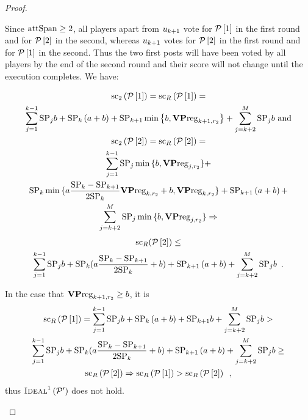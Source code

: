 \documentclass[a4paper,english,cleveref, autoref]{oasics-v2019}
\begin{document}
\begin{subappendices}
\begin{proof}
\begin{itemize}
    Since $\mathrm{attSpan} \geq 2$, all players apart from $u_{k + 1}$ vote for
    $\mathcal{P}\left[1\right]$ in the first round and for
    $\mathcal{P}\left[2\right]$ in the second, whereas $u_{k + 1}$ votes for
    $\mathcal{P}\left[2\right]$ in the first round and for
    $\mathcal{P}\left[1\right]$ in the second. Thus the two first posts will have
    been voted by all players by the end of the second round and their score
    will not change until the execution completes. We have:

    \begin{gather*}
      \mathrm{sc}_2\left(\mathcal{P}\left[1\right]\right) =
      \mathrm{sc}_R\left(\mathcal{P}\left[1\right]\right) = \\
      \sum\limits_{j = 1}^{k-1}\mathrm{SP}_j b + \mathrm{SP}_k \left(a + b\right) +
      \mathrm{SP}_{k+1} \min{\left\{b, \mathrm{\textbf{VP}reg}_{k+1,r_2}\right\}} +
      \sum\limits_{j = k + 2}^{M}\mathrm{SP}_j b \text{ and} \\
      \mathrm{sc}_2\left(\mathcal{P}\left[2\right]\right) =
      \mathrm{sc}_R\left(\mathcal{P}\left[2\right]\right) = \\
      \sum\limits_{j = 1}^{k-1}\mathrm{SP}_j \min{\{b, \mathrm{\textbf{VP}reg}_{j,r_2}\}} + \\
      \mathrm{SP}_k \min{\{a \frac{\mathrm{SP}_k - \mathrm{SP}_{k+1}}{2\mathrm{SP}_k}
      \mathrm{\textbf{VP}reg}_{k, r_2} + b, \mathrm{\textbf{VP}reg}_{k, r_2}\}} + \mathrm{SP}_{k+1}
      \left(a + b\right) + \\
      \sum\limits_{j = k + 2}^{M}\mathrm{SP}_j \min{\{b, \mathrm{\textbf{VP}reg}_{j,
      r_2}\}} \Rightarrow
    \end{gather*}
    \begin{gather*}
      \mathrm{sc}_R(\mathcal{P}\left[2\right]) \leq \\
      \sum\limits_{j = 1}^{k-1}\mathrm{SP}_j b + \mathrm{SP}_k (a \frac{\mathrm{SP}_k -
      \mathrm{SP}_{k+1}}{2\mathrm{SP}_k} + b) + \mathrm{SP}_{k+1} \left(a + b\right) +
      \sum\limits_{j = k + 2}^{M}\mathrm{SP}_j b \enspace.
    \end{gather*}

    In the case that $\mathrm{\textbf{VP}reg}_{k+1, r_2} \geq b$, it is
    \begin{gather*}
      \mathrm{sc}_R\left(\mathcal{P}\left[1\right]\right) = \sum\limits_{j =
      1}^{k-1}\mathrm{SP}_j b + \mathrm{SP}_k \left(a + b\right) + \mathrm{SP}_{k+1} b +
      \sum\limits_{j = k + 2}^{M}\mathrm{SP}_j b > \\
      \sum\limits_{j = 1}^{k-1}\mathrm{SP}_j b + \mathrm{SP}_k (a \frac{\mathrm{SP}_k -
      \mathrm{SP}_{k+1}}{2\mathrm{SP}_k} + b) + \mathrm{SP}_{k+1} \left(a + b\right) +
      \sum\limits_{j = k + 2}^{M}\mathrm{SP}_j b \geq \\
      \mathrm{sc}_R\left(\mathcal{P}\left[2\right]\right) \Rightarrow
      \mathrm{sc}_R\left(\mathcal{P}\left[1\right]\right) >
      \mathrm{sc}_R\left(\mathcal{P}\left[2\right]\right) \enspace,
    \end{gather*}
    thus $\textsc{Ideal}^1\left(\mathcal{P}'\right)$ does not hold.


\end{itemize}
\end{proof}
\end{subappendices}
\end{document}
